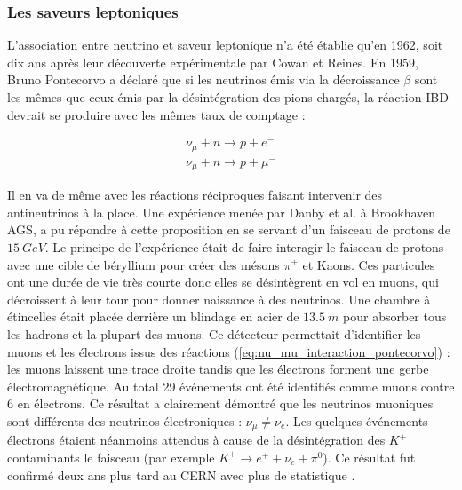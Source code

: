 \bigbreak

\subsubsection*{Les saveurs leptoniques}
\label{sec:lept_flavors}

L'association entre neutrino et saveur leptonique n'a été établie qu'en 1962, soit dix ans après leur découverte expérimentale par Cowan et Reines. En 1959, Bruno Pontecorvo a déclaré que si les neutrinos émis via la décroissance $\beta$ sont les mêmes que ceux émis par la désintégration des pions chargés, la réaction IBD devrait se produire avec les mêmes taux de comptage \cite{Pontecorvo:1959sn}:

\begin{equation}
\label{eq:nu_mu_interaction_pontecorvo}
    \begin{gathered}
        \nu_\mu + n \rightarrow p + e^-\\
        \nu_\mu + n \rightarrow p + \mu^-
    \end{gathered}
\end{equation}

\bigbreak

Il en va de même avec les réactions réciproques faisant intervenir des antineutrinos à la place. Une expérience menée par Danby et al. \cite{Danby:1962nd} à Brookhaven AGS, a pu répondre à cette proposition en se servant d'un faisceau de protons de $\SI{15}{GeV}$. Le principe de l'expérience était de faire interagir le faisceau de protons avec une cible de béryllium pour créer des mésons $\pi^\pm$ et Kaons. Ces particules ont une durée de vie très courte donc elles se désintègrent en vol en muons, qui décroissent à leur tour pour donner naissance à des neutrinos. Une chambre à étincelles était placée derrière un blindage en acier de $\SI{13.5}{m}$ pour absorber tous les hadrons et la plupart des muons. Ce détecteur permettait d'identifier les muons et les électrons issus des réactions  (\ref{eq:nu_mu_interaction_pontecorvo})   : les muons laissent une trace droite tandis que les électrons forment une gerbe électromagnétique. Au total 29 événements ont été identifiés comme muons contre 6 en électrons. Ce résultat a clairement démontré que les neutrinos \og muoniques \fg sont différents des neutrinos \og électroniques \fg{}: $\nu_\mu \neq \nu_e$. Les quelques événements électrons étaient néanmoins attendus à cause de la désintégration des $K^+$ contaminants le faisceau (par exemple $K^+ \rightarrow e^+ + \nu_e + \pi^0$). Ce résultat fut confirmé deux ans plus tard au CERN avec plus de statistique \cite{Bienlein:1986gk}.\\



